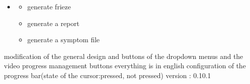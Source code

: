 \documentclass[letterpaper,10pt,english]{sphinxmanual}
\begin{document}
\begin{itemize}
\begin{description}
\begin{itemize}
\item {} 
\sphinxAtStartPar
cascading menus on left

\item {} 
\sphinxAtStartPar
search bar

\item {} 
\sphinxAtStartPar
correct initialization of symptoms

\item {} 
\sphinxAtStartPar
retrieve symptoms from a list

\item {} 
\sphinxAtStartPar
retrieve start and end times

\item {} 
\sphinxAtStartPar
display symptoms on the right

\item {} 
\sphinxAtStartPar
scrollable symptoms

\item {} 
\sphinxAtStartPar
pop\sphinxhyphen{}up to modify symptoms

\end{itemize}

\end{description}

\item {} \begin{description}
\begin{itemize}
\item {} 
\sphinxAtStartPar
generate frieze

\item {} 
\sphinxAtStartPar
generate a report

\item {} 
\sphinxAtStartPar
generate a symptom file

\end{itemize}

\end{description}

\end{itemize}

\sphinxAtStartPar
modification of the general design and buttons of the drop\sphinxhyphen{}down menus and the video progress management buttons
everything is in english
configuration of the progress bar(state of the cursor:pressed, not pressed)
version : 0.10.1
\end{document}
